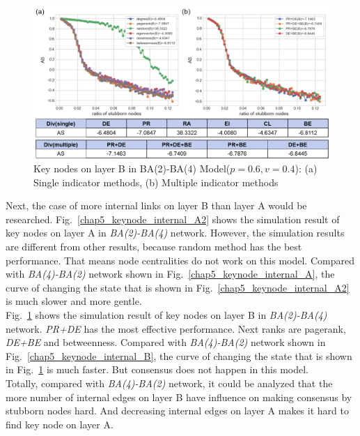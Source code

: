 \begin{figure}[!htb]
	\centering
	\includegraphics[width=\hsize]{figure/chap5_keynode_internal_B2.png}
	\caption{Key nodes on layer B in BA(2)-BA(4) Model($p=0.6, v=0.4$):
		(a) Single indicator methods, (b) Multiple indicator methods}
	\label{chap5_keynode_internal_B2}
\end{figure}
Next, the case of more internal links on layer B than layer A would be researched. 
Fig.~\ref{chap5_keynode_internal_A2} shows the simulation result of key nodes on layer A in \textit{BA(2)-BA(4)} network. However, the simulation results are different from other results, because random method has the best performance. That means node centralities do not work on this model. Compared with \textit{BA(4)-BA(2)} network shown in Fig.~\ref{chap5_keynode_internal_A}, the curve of changing the state that is shown in Fig.~\ref{chap5_keynode_internal_A2}  is much slower and more gentle.\\
Fig.~\ref{chap5_keynode_internal_B2} shows the simulation result of key nodes on layer B in \textit{BA(2)-BA(4)} network. \textit{PR+DE} has the most effective performance. Next ranks are pagerank, \textit{DE+BE} and betweenness. Compared with \textit{BA(4)-BA(2)} network shown in Fig.~\ref{chap5_keynode_internal_B}, the curve of changing the state that is shown in Fig.~\ref{chap5_keynode_internal_B2} is much faster. But consensus does not happen in this model. \\ 
Totally, compared with \textit{BA(4)-BA(2)} network, it could be analyzed that the more number of internal edges on layer B have influence on making consensus by stubborn nodes hard. And decreasing internal edges on layer A makes it hard to find key node on layer A.   

